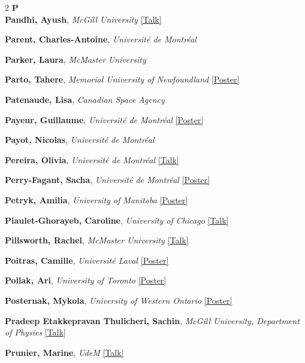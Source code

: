 \begin{small}
\begin{multicols}{2}
{\sffamily\bfseries\color{cascablue}\large P}\\[2pt]

\textbf{Pandhi, Ayush}, {\footnotesize\textit{McGill University}} \hyperref[abstract-page-talk-52]{\scriptsize\textcolor{cascablue}{[Talk]}}\par
\textbf{Parent, Charles-Antoine}, {\footnotesize\textit{Université de Montréal}}\par
\textbf{Parker, Laura}, {\footnotesize\textit{McMaster University}}\par
\textbf{Parto, Tahere}, {\footnotesize\textit{Memorial University of Newfoundland}} \hyperref[poster-abstract-page-talk-306]{\scriptsize\textcolor{cascateal}{[Poster]}}\par
\textbf{Patenaude, Lisa}, {\footnotesize\textit{Canadian Space Agency}}\par
\textbf{Payeur, Guillaume}, {\footnotesize\textit{Université de Montréal}} \hyperref[poster-abstract-page-talk-256]{\scriptsize\textcolor{cascateal}{[Poster]}}\par
\textbf{Payot, Nicolas}, {\footnotesize\textit{Université de Montréal}}\par
\textbf{Pereira, Olivia}, {\footnotesize\textit{Université de Montréal}} \hyperref[abstract-page-talk-184]{\scriptsize\textcolor{cascablue}{[Talk]}}\par
\textbf{Perry-Fagant, Sacha}, {\footnotesize\textit{Université de Montréal}} \hyperref[poster-abstract-page-talk-216]{\scriptsize\textcolor{cascateal}{[Poster]}}\par
\textbf{Petryk, Amilia}, {\footnotesize\textit{University of Manitoba}} \hyperref[poster-abstract-page-talk-257]{\scriptsize\textcolor{cascateal}{[Poster]}}\par
\textbf{Piaulet-Ghorayeb, Caroline}, {\footnotesize\textit{University of Chicago}} \hyperref[abstract-page-talk-126]{\scriptsize\textcolor{cascablue}{[Talk]}}\par
\textbf{Pillsworth, Rachel}, {\footnotesize\textit{McMaster University}} \hyperref[abstract-page-talk-6]{\scriptsize\textcolor{cascablue}{[Talk]}}\par
\textbf{Poitras, Camille}, {\footnotesize\textit{Université Laval}} \hyperref[poster-abstract-page-talk-12]{\scriptsize\textcolor{cascateal}{[Poster]}}\par
\textbf{Pollak, Ari}, {\footnotesize\textit{University of Toronto}} \hyperref[poster-abstract-page-talk-313]{\scriptsize\textcolor{cascateal}{[Poster]}}\par
\textbf{Posternak, Mykola}, {\footnotesize\textit{University of Western Ontario}} \hyperref[poster-abstract-page-talk-88]{\scriptsize\textcolor{cascateal}{[Poster]}}\par
\textbf{Pradeep Etakkepravan Thulicheri, Sachin}, {\footnotesize\textit{McGill University, Department of Physics}} \hyperref[abstract-page-talk-164]{\scriptsize\textcolor{cascablue}{[Talk]}}\par
\textbf{Prunier, Marine}, {\footnotesize\textit{UdeM}} \hyperref[abstract-page-talk-18]{\scriptsize\textcolor{cascablue}{[Talk]}}\par


\end{multicols}
\end{small}
